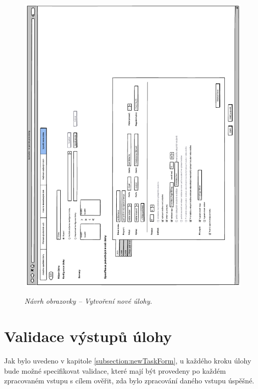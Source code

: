 \begin{figure}[H]
\begin{center}
    \scalebox{0.8}
    {   
        \includegraphics{images/wireframe_newTaskForm.pdf}
    }
    \caption{\label{obr:wireframe_newTaskForm} {\it Návrh obrazovky -- Vytvoření nové úlohy.}}
\end{center}
\end{figure}



\section{Validace výstupů úlohy}
\label{section:validationDesign}

Jak bylo uvedeno v kapitole \ref{subsection:newTaskForm}, u každého kroku úlohy bude možné specifikovat validace, které mají být provedeny po každém zpracovaném vstupu s cílem ověřit, zda bylo zpracování daného vstupu úspěšné.

